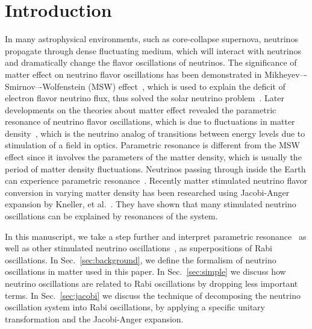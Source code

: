 \documentclass[%
reprint,
 amsmath,amssymb,
 aps,
]{revtex4-1}
\begin{document}
\maketitle


\section{\label{introduction}Introduction}

In many astrophysical environments, such as core-collapse supernova,  neutrinos propagate through dense fluctuating medium, which will interact with neutrinos and dramatically change the flavor oscillations of neutrinos. The significance of matter effect on neutrino flavor oscillations has been demonstrated in Mikheyev–-Smirnov–-Wolfenstein (MSW) effect~\cite{Mikheev:1986gs,wolf78,wolfensteinprd1979}, which is used to explain the deficit of electron flavor neutrino flux, thus solved the solar neutrino problem~\cite{Petcov2002,kuo1989}. Later developments on the theories about matter effect revealed the parametric resonance of neutrino flavor oscillations, which is due to fluctuations in matter density~\cite{Krastev1989,Akhmedov2000}, which is the neutrino analog of transitions between energy levels due to stimulation of a field in optics. Parametric resonance is different from the MSW effect since it involves the parameters of the matter density, which is usually the period of matter density fluctuations. Neutrinos passing through inside the Earth can experience parametric resonance~\cite{Akhmedov1999, Petcov1998b}. Recently matter stimulated neutrino flavor conversion in varying matter density has been researched using Jacobi-Anger expansion by Kneller, et al.~\cite{Kneller2013,Patton2014}. They have shown that many stimulated neutrino oscillations can be explained by resonances of the system.

In this manuscript, we take a step further and interpret parametric resonance~\cite{Akhmedov2000, Krastev1989} as well as other stimulated neutrino oscillations~\cite{Kneller2013, Patton2014}, as superpositions of Rabi oscillations. In Sec.~\ref{sec:background}, we define the formalism of neutrino oscillations in matter used in this paper. In Sec.~\ref{sec:simple} we discuss how neutrino oscillations are related to Rabi oscillations by dropping less important terms. In Sec.~\ref{sec:jacobi} we discuss the technique of decomposing the neutrino oscillation system into Rabi oscillations, by applying a specific unitary transformation and the Jacobi-Anger expansion.
\end{document}
